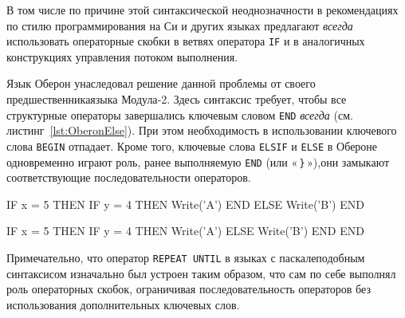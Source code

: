 \documentclass[utf8]{lgu}
\newcommand{\tire}{\unskip\nobreak\thinspace\textemdash\thinspace}
\newcommand{\code}[1]{{\normalsize\texttt{#1}}}
\begin{document}
В том числе по причине этой синтаксической неоднозначности в рекомендациях по стилю программирования на Си и других языках предлагают \textit{всегда} использовать операторные скобки в ветвях оператора \code{IF} и в аналогичных конструкциях управления потоком выполнения.

Язык Оберон унаследовал решение данной проблемы от своего предшественника\tire языка Модула‑2. Здесь синтаксис требует, чтобы все структурные операторы завершались ключевым словом \code{END} \textit{всегда} (см. листинг~\ref{lst:OberonElse}). При этом необходимость в использовании ключевого слова \code{BEGIN} отпадает. Кроме того, ключевые слова \code{ELSIF} и \code{ELSE} в Обероне одновременно играют роль, ранее выполняемую \code{END} (или «\,\code{\}}\,»),\tire они замыкают соответствующие последовательности операторов.

\begin{listing}[H]
\caption{Вложенный IF THEN ELSE в Обероне}
\label{lst:OberonElse}
\end{listing}

\begin{center}
\vspace{-45pt}
\begin{minipage}[t]{0.45\textwidth}

\begin{listing}[H]
\begin{modula2}
IF x = 5 THEN
  IF y = 4 THEN
    Write('A')
  END
ELSE
  Write('B')
END
\end{modula2}
\end{listing}

\end{minipage}
\hfill
\begin{minipage}[t]{0.45\textwidth}

\begin{listing}[H]
\begin{modula2}
IF x = 5 THEN
  IF y = 4 THEN
    Write('A')
  ELSE
    Write('B')
  END
END
\end{modula2}
\end{listing}

\end{minipage}
\end{center}

Примечательно, что оператор \code{REPEAT UNTIL} в языках с паскалеподобным синтаксисом изначально был устроен таким образом, что сам по себе выполнял роль операторных скобок, ограничивая последовательность операторов без использования дополнительных ключевых слов.
\end{document}
